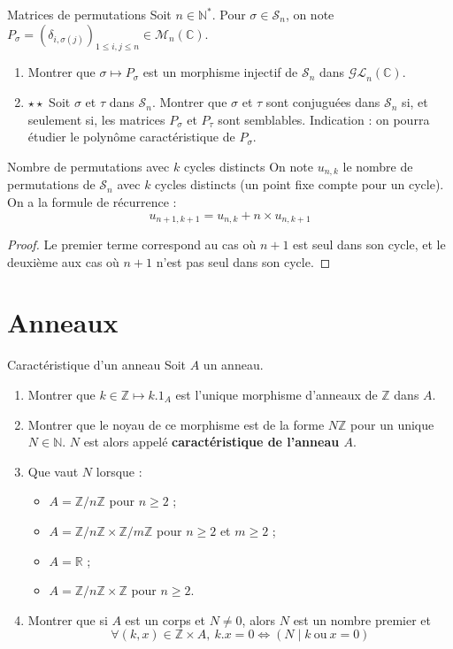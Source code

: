 \documentclass[french,a4paper]{article}
\newcommand{\N}{\mathbb{N}}
\newcommand{\Z}{\mathbb{Z}}
\newcommand{\R}{\mathbb{R}}
\newcommand{\C}{\mathbb{C}}
\newcommand{\st}{^*}
\theoremstyle{plain}
\theoremstyle{definition}
\theoremstyle{remark}
\begin{document}
\begin{ex}[Moulin.AG.29]{Matrices de permutations}
	Soit $n\in\N\st$. Pour $\sigma\in\mathcal{S}_n$, on note $P_\sigma=(\delta_{i,\sigma(j)})_{1\leqslant i,j\leqslant n}\in\mathcal{M}_n(\C)$.
	\begin{enumerate}
		\item Montrer que $\sigma\mapsto P_\sigma$ est un morphisme injectif de $\mathcal{S}_n$ dans $\mathcal{GL}_n(\C)$.
		\item $\star\star$ Soit $\sigma$ et $\tau$ dans $\mathcal{S}_n$. Montrer que $\sigma$ et $\tau$ sont conjuguées dans $\mathcal{S}_n$ si, et seulement si, les matrices $P_\sigma$ et $P_\tau$ sont semblables. Indication : on pourra étudier le polynôme caractéristique de $P_\sigma$.
	\end{enumerate}
\end{ex}

\begin{ex}{Nombre de permutations avec $k$ cycles distincts}
	On note $u_{n,k}$ le nombre de permutations de $\mathcal{S}_n$ avec $k$ cycles distincts (un point fixe compte pour un cycle). On a la formule de récurrence : $$u_{n+1,k+1}=u_{n,k}+n\times u_{n,k+1}$$
\end{ex}

\begin{proof}
	Le premier terme correspond au cas où $n+1$ est seul dans son cycle, et le deuxième aux cas où $n+1$ n'est pas seul dans son cycle.
\end{proof}

\section{Anneaux}

\begin{ex}[Moulin.AG.30]{Caractéristique d'un anneau}
	Soit $A$ un anneau.
	\begin{enumerate}
		\item Montrer que $k\in\Z\mapsto k.1_A$ est l'unique morphisme d'anneaux de $\Z$ dans $A$.
		\item Montrer que le noyau de ce morphisme est de la forme $N\Z$ pour un unique $N\in\N$. $N$ est alors appelé \textbf{caractéristique de l'anneau $A$}.
		\item Que vaut $N$ lorsque :
		\begin{itemize}
			\item $A=\Z/n\Z$ pour $n\geqslant 2$ ;
			\item $A=\Z/n\Z\times\Z/m\Z$ pour $n\geqslant 2$ et $m\geqslant2$ ;
			\item $A=\R$ ;
			\item $A=\Z/n\Z\times \Z$ pour $n\geqslant 2$.
		\end{itemize}
		\item Montrer que si $A$ est un corps et $N\ne 0$, alors $N$ est un nombre premier et $$\forall (k,x)\in\Z\times A,\ k.x=0\iff (N\mid k\ \text{ou}\ x=0)$$
	\end{enumerate}
\end{ex}
\end{document}
